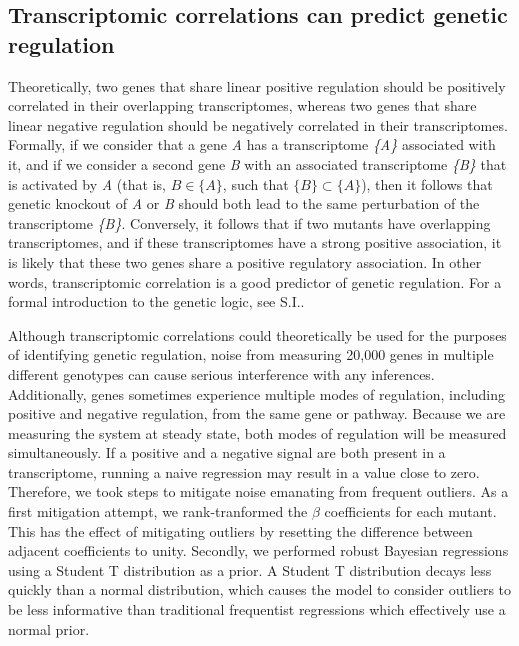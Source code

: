\documentclass[9pt,twocolumn,twoside]{pnas-new}
\begin{document}
\subsection{Transcriptomic correlations can predict genetic regulation}
\label{sub:Transcriptomic genetic analyses}

Theoretically, two genes that share linear positive regulation should be positively correlated in their overlapping transcriptomes, whereas two genes that share linear negative regulation should be negatively correlated in their transcriptomes. Formally, if we consider that a gene \emph{A} has a transcriptome \emph{\{A\}} associated with it, and if we consider a second gene \emph{B} with an associated transcriptome \emph{\{B\}} that is activated by \emph{A} (that is, $B \in \{A\}$, such that $\{B\} \subset \{A\}$), then it follows that genetic knockout of \emph{A} or \emph{B} should both lead to the same perturbation of the transcriptome \emph{\{B\}}. Conversely, it follows that if two mutants have overlapping transcriptomes, and if these transcriptomes have a strong positive association, it is likely that these two genes share a positive regulatory association. In other words, transcriptomic correlation is a good predictor of genetic regulation. For a formal introduction to the genetic logic, see S.I..

Although transcriptomic correlations could theoretically be used for the purposes of identifying genetic regulation, noise from measuring 20,000 genes in multiple different genotypes can cause serious interference with any inferences. Additionally, genes sometimes experience multiple modes of regulation, including positive and negative regulation, from the same gene or pathway. Because we are measuring the system at steady state, both modes of regulation will be measured simultaneously. If a positive and a negative signal are both present in a transcriptome, running a naive regression may result in a value close to zero.
Therefore, we took steps to mitigate noise emanating from frequent outliers. As a first mitigation attempt, we rank-tranformed the $\beta$ coefficients for each mutant. This has the effect of mitigating outliers by resetting the difference between adjacent coefficients to unity. Secondly, we performed robust Bayesian regressions using a Student T distribution as a prior. A Student T distribution decays less quickly than a normal distribution, which causes the model to consider outliers to be less informative than traditional frequentist regressions which effectively use a normal prior.
\end{document}

